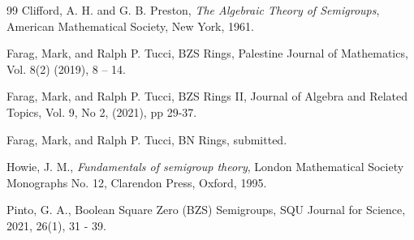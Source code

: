 \documentclass[12pt]{amsart}
\theoremstyle{plain}
\theoremstyle{definition}
\begin{document}
\begin {thebibliography} {99}
 Clifford, A. H. and G. B. Preston, \emph{The Algebraic Theory of Semigroups}, American Mathematical Society, New York, 1961.

Farag, Mark, and Ralph P. Tucci, BZS Rings, Palestine Journal of Mathematics, Vol. 8(2) (2019), 8 – 14.

Farag, Mark, and Ralph P. Tucci, BZS Rings II, Journal of Algebra and Related Topics, Vol. 9, No 2, (2021), pp 29-37.

Farag, Mark, and Ralph P. Tucci, BN Rings, submitted. 


Howie, J. M., \emph{Fundamentals of semigroup theory},  London Mathematical Society Monographs No. 12, Clarendon Press, Oxford, 1995.

Pinto, G. A., Boolean Square Zero (BZS) Semigroups, SQU Journal for Science, 2021, 26(1), 31 - 39.

\end {thebibliography}



\end{document}
